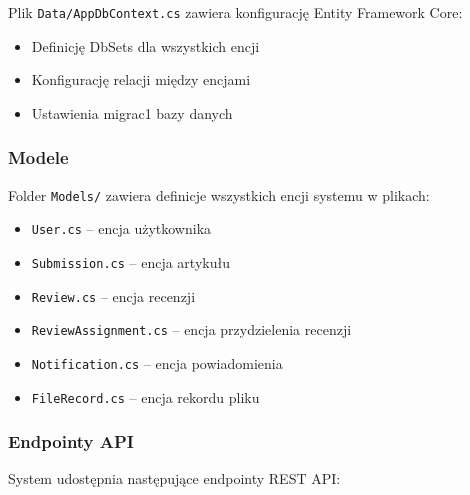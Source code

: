 \documentclass[times]{san}
\begin{document}
Plik \texttt{Data/AppDbContext.cs} zawiera konfigurację Entity Framework Core:

\begin{itemize}
    \item Definicję DbSets dla wszystkich encji
    \item Konfigurację relacji między encjami
    \item Ustawienia migrac1 bazy danych
\end{itemize}

\subsubsection{Modele}

Folder \texttt{Models/} zawiera definicje wszystkich encji systemu w plikach:

\begin{itemize}
    \item \texttt{User.cs} -- encja użytkownika
    \item \texttt{Submission.cs} -- encja artykułu
    \item \texttt{Review.cs} -- encja recenzji
    \item \texttt{ReviewAssignment.cs} -- encja przydzielenia recenzji
    \item \texttt{Notification.cs} -- encja powiadomienia
    \item \texttt{FileRecord.cs} -- encja rekordu pliku
\end{itemize}

\subsubsection{Endpointy API}

System udostępnia następujące endpointy REST API:
\end{document}
